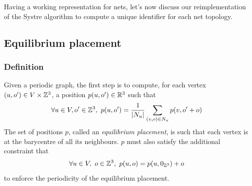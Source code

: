 \documentclass[main.tex]{subfiles}
\begin{document}

Having a working representation for nets, let's now discuss our reimplementation of the Systre algorithm \autocite{Systre} to compute a unique identifier for each net topology.



\subsection{Equilibrium placement}

\subsubsection{Definition}

Given a periodic graph, the first step is to compute, for each vertex $(u,o')\in V\times\mathbb{Z}^3$, a position $p(u,o')\in\mathbb{R}^3$ such that
\begin{equation}
	\forall u\in V,o'\in\mathbb{Z}^3,\ p(u,o') = \frac1{\left|N_{u}\right|}\sum_{(v,o)\in N_{u}}p(v,o'+o)
	\label{equilibrium1}
\end{equation}
The set of positions $p$, called an \emph{equilibrium placement}, is such that each vertex is at the barycentre of all its neighbours. $p$ must also satisfy the additional constraint that
\begin{equation}
	\forall u\in V,\ o\in\mathbb{Z}^3,\ p(u,o) = p(u,0_{\mathbb{Z}^3}) + o
	\label{equilibrium2}
\end{equation}
to enforce the periodicity of the equilibrium placement.
\end{document}
